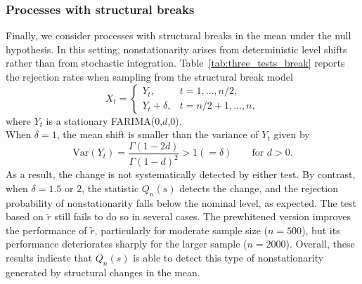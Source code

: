 \documentclass[12pt]{article}
\numberwithin{equation}{section}
\begin{document}
\subsubsection{Processes with structural breaks}
Finally, we consider processes with structural breaks in the mean under the null hypothesis. In this setting, nonstationarity arises from deterministic level shifts rather than from stochastic integration. Table~\ref{tab:three_tests_break} reports the rejection rates when sampling from the structural break model
\[
X_t=
\begin{cases}
Y_t, & t=1,\ldots,n/2,\\[6pt]
Y_t+\delta, & t=n/2+1,\ldots,n,
\end{cases}
\]
where $Y_t$ is a stationary FARIMA(0,$d$,0).\\
When $\delta=1$, the mean shift is smaller than the variance of $Y_t$ given by
\[
\textrm{Var}(Y_t)=\frac{\Gamma(1-2d)}{\Gamma(1-d)^2} > 1(=\delta) \qquad \text{for } d>0.
\]
As a result, the change is not systematically detected by either test. By contrast, when $\delta=1.5$ or $2$, the statistic $Q_n(s)$ detects the change, and the rejection probability of nonstationarity falls below the nominal level, as expected. The test based on $\tilde r$ still fails to do so in several cases. The prewhitened version improves the performance of $\tilde r$, particularly for moderate sample size ($n=500$), but its performance deteriorates sharply for the larger sample ($n=2000$). Overall, these results indicate that $Q_n(s)$ is able to detect this type of nonstationarity generated by structural changes in the mean.
%
\end{document}
